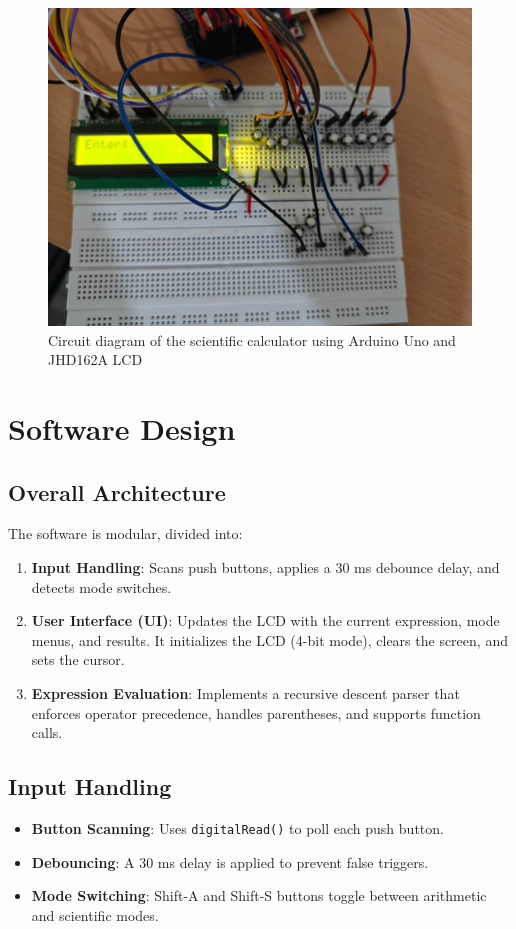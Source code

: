 \documentclass{article}
\theoremstyle{remark}
\begin{document}
\newpage

\begin{figure}[h!]
    \centering
    \includegraphics[width=0.9\columnwidth]{figs/circuit.png}
    \caption{Circuit diagram of the scientific calculator using Arduino Uno and JHD162A LCD}
    \label{fig:circuit_diagram}
\end{figure}


\section{Software Design}
\subsection{Overall Architecture}
The software is modular, divided into:
\begin{enumerate}[label=\alph*)]
    \item \textbf{Input Handling}: Scans push buttons, applies a 30 ms debounce delay, and detects mode switches.
    \item \textbf{User Interface (UI)}: Updates the LCD with the current expression, mode menus, and results. It initializes the LCD (4-bit mode), clears the screen, and sets the cursor.
    \item \textbf{Expression Evaluation}: Implements a recursive descent parser that enforces operator precedence, handles parentheses, and supports function calls.
\end{enumerate}

\subsection{Input Handling}
\begin{itemize}[noitemsep]
    \item \textbf{Button Scanning}: Uses \texttt{digitalRead()} to poll each push button.
    \item \textbf{Debouncing}: A 30 ms delay is applied to prevent false triggers.
    \item \textbf{Mode Switching}: Shift-A and Shift-S buttons toggle between arithmetic and scientific modes.
\end{itemize}
\end{document}
